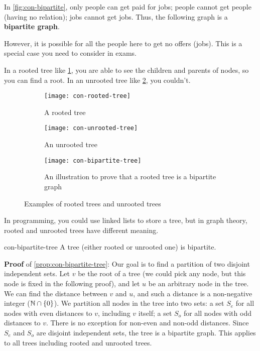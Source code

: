 \documentclass[../src/handouts/main.tex]{subfiles}
\begin{document}
In \cref{fig:con-bipartite}, only people can get paid for jobs; people cannot get people (having no relation); jobs cannot get jobs. Thus, the following graph is a \textbf{bipartite graph}.

However, it is possible for all the people here to get no offers (jobs). This is a special case you need to consider in exams.

In a rooted tree like \cref{fig:con-rooted-tree}, you are able to see the children and parents of nodes, so you can find a root. In an unrooted tree like \cref{fig:con-unrooted-tree}, you couldn't. %

\begin{figure}[ht]
  \centering
  \begin{subfigure}[t]{.2\textwidth}
    \centering
    \texttt{[image: con-rooted-tree]}
    \caption{A rooted tree}
    \label{fig:con-rooted-tree}
  \end{subfigure}
  \hspace{.1\textwidth}
  \begin{subfigure}[t]{.2\textwidth}
    \centering
    \texttt{[image: con-unrooted-tree]}
    \caption{An unrooted tree}
    \label{fig:con-unrooted-tree}
  \end{subfigure}
  \hspace{.1\textwidth}
  \begin{subfigure}[t]{.3\textwidth}
    \centering
    \texttt{[image: con-bipartite-tree]}
    \caption{An illustration to prove that a rooted tree is a bipartite graph}
    \label{fig:con-bipartite-tree}
  \end{subfigure}
  \caption{Examples of rooted trees and unrooted trees}
  \label{fig:con-rooted-unrooted-trees}
\end{figure}

In programming, you could use linked lists to store a tree, but in graph theory, rooted and unrooted trees have different meaning.

\begin{proposition}{}{con-bipartite-tree}
  A tree (either rooted or unrooted one) is bipartite.
\end{proposition}

\textbf{Proof} of \cref{prop:con-bipartite-tree}:
Our goal is to find a partition of two disjoint independent sets.
Let $v$ be the root of a tree (we could pick any node, but this node is fixed in the following proof), and let $u$ be an arbitrary node in the tree.
We can find the distance between $v$ and $u$, and such a distance is a non-negative integer ($\mathbb{N} \cap \{ 0 \}$).
We partition all nodes in the tree into two sets: a set $S_e$ for all nodes with even distances to $v$, including $v$ itself; a set $S_o$ for all nodes with odd distances to $v$.
There is no exception for non-even and non-odd distances.
Since $S_e$ and $S_o$ are disjoint independent sets, the tree is a bipartite graph.
This applies to all trees including rooted and unrooted trees.
\end{document}
